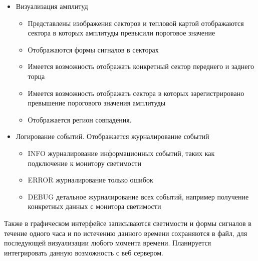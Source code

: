 \begin{itemize}
  \item Визуализация амплитуд
  \begin{itemize}
    \item Представлены изображения секторов и тепловой картой отображаются сектора в которых амплитуды превысили пороговое значение
    \item Отображаются формы сигналов в секторах
    \item Имеется возможность отображать конкретный сектор переднего и заднего торца
    \item Имеется возможность отображать сектора в которых зарегистрировано превышение порогового значения амплитуды
    \item Отображается регион совпадения.
  \end{itemize}
  \item Логирование событий. Отображается журналирование событий
    \begin{itemize}
      \item INFO журналирование информационных событий, таких как подключение к монитору светимости
      \item ERROR журналирование только ошибок
      \item DEBUG детальное журналирование всех событий, например получение конкретных данных с монитора светимости
    \end{itemize}
\end{itemize}\par
  Также в графическом интерфейсе записываются светимости и формы сигналов в течение одного часа и по истечению данного времени сохраняются в файл, для последующей визуализации любого момента времени. Планируется интегрировать данную возможность с веб сервером.
